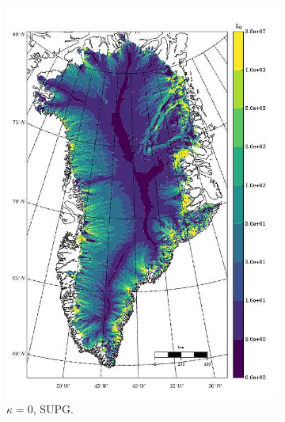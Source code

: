 \begin{figure}
\begin{subfigure}[b]{0.25\linewidth}
    \includegraphics[width=\linewidth]{images/balance_velocity/greenland/Ubar_5H_kappa_0_SUPG.jpg}
  \caption{$\kappa = 0$, SUPG.}
  \label{greenland_bv_image_kappa_0_SUPG}
  \end{subfigure}
  \begin{subfigure}[b]{0.25\linewidth}

\end{subfigure}
\end{figure}

